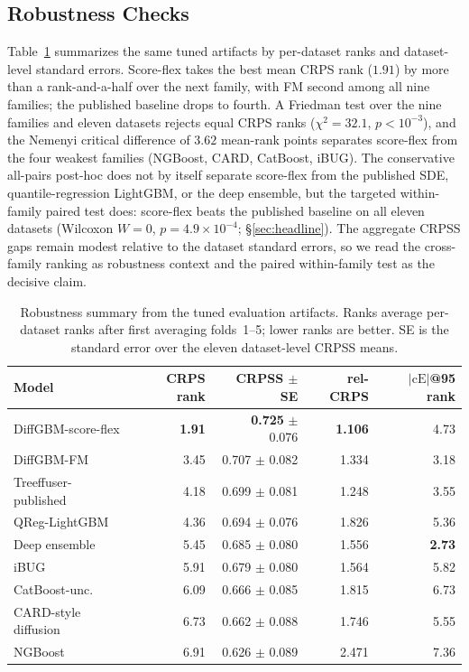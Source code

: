 \documentclass{article}
\begin{document}
\subsection{Robustness Checks}\label{sec:robustness}
Table~\ref{tab:robustness-ranks} summarizes the same tuned artifacts by per-dataset ranks and dataset-level standard errors. Score-flex takes the best mean CRPS rank ($1.91$) by more than a rank-and-a-half over the next family, with FM second among all nine families; the published baseline drops to fourth. A Friedman test over the nine families and eleven datasets rejects equal CRPS ranks ($\chi^2=32.1$, $p<10^{-3}$), and the Nemenyi critical difference of $3.62$ mean-rank points separates score-flex from the four weakest families (NGBoost, CARD, CatBoost, iBUG). The conservative all-pairs post-hoc does not by itself separate score-flex from the published SDE, quantile-regression LightGBM, or the deep ensemble, but the targeted within-family paired test does: score-flex beats the published baseline on all eleven datasets (Wilcoxon $W{=}0$, $p=4.9\times10^{-4}$; \S\ref{sec:headline}). The aggregate CRPSS gaps remain modest relative to the dataset standard errors, so we read the cross-family ranking as robustness context and the paired within-family test as the decisive claim.

\begin{table}[!t]
  \centering
  \caption{Robustness summary from the tuned evaluation artifacts. Ranks average per-dataset ranks after first averaging folds~1--5; lower ranks are better. SE is the standard error over the eleven dataset-level CRPSS means.}\label{tab:robustness-ranks}
  \scriptsize
  \begin{tabular}{lrrrr}
    \toprule
    Model & CRPS rank & CRPSS $\pm$ SE & rel-CRPS & $|\text{cE}|$@95 rank \\
    \midrule
    DiffGBM-score-flex & \textbf{1.91} & \textbf{0.725} $\pm$ 0.076 & \textbf{1.106} & 4.73 \\
    DiffGBM-FM & 3.45 & 0.707 $\pm$ 0.082 & 1.334 & 3.18 \\
    Treeffuser-published & 4.18 & 0.699 $\pm$ 0.081 & 1.248 & 3.55 \\
    QReg-LightGBM & 4.36 & 0.694 $\pm$ 0.076 & 1.826 & 5.36 \\
    Deep ensemble & 5.45 & 0.685 $\pm$ 0.080 & 1.556 & \textbf{2.73} \\
    iBUG & 5.91 & 0.679 $\pm$ 0.080 & 1.564 & 5.82 \\
    CatBoost-unc. & 6.09 & 0.666 $\pm$ 0.085 & 1.815 & 6.73 \\
    CARD-style diffusion & 6.73 & 0.662 $\pm$ 0.088 & 1.746 & 5.55 \\
    NGBoost & 6.91 & 0.626 $\pm$ 0.089 & 2.471 & 7.36 \\
    \bottomrule
  \end{tabular}
\end{table}
\end{document}
